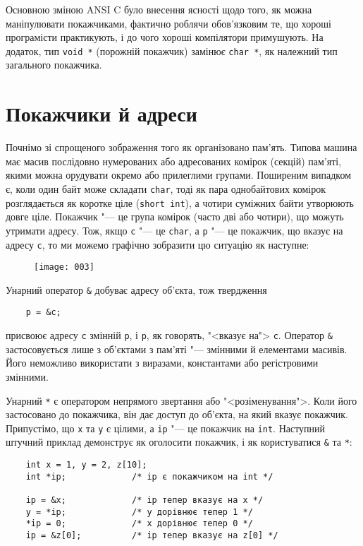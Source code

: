 \documentclass[a4paper,12pt]{book}
\begin{document}
  Основною зміною ANSI C було внесення ясності щодо того, як можна маніпулювати
  покажчиками, фактично роблячи обов'язковим те, що хороші програмісти практикують, і до
  чого хороші компілятори примушують. На додаток, тип \texttt{void *} (порожній покажчик)
  замінює \texttt{char *}, як належний тип загального покажчика.

\section{Покажчики й адреси}


  Почнімо зі спрощеного зображення того як організовано пам'ять. Типова машина має масив
  послідовно нумерованих або адресованих комірок (секцій) пам'яті, якими можна орудувати
  окремо або прилеглими групами. Поширеним випадком є, коли один байт може складати
  \texttt{char}, тоді як пара однобайтових комірок розглядається як коротке ціле
  (\texttt{short int}), а чотири суміжних байти утворюють довге ціле. Покажчик "--- це
  група комірок (часто дві або чотири), що можуть утримати адресу. Тож, якщо \texttt{c}
  "--- це \texttt{char}, а \texttt{p} "--- це покажчик, що вказує на адресу
  \texttt{c}, то ми можемо графічно зобразити цю ситуацію як наступне:
  \begin{figure}[!htb]
  \centering
  \texttt{[image: 003]}
  \end{figure}

  Унарний оператор \texttt{\&} добуває адресу об'єкта, тож твердження
  \begin{verbatim}
    p = &c;
  \end{verbatim}
  присвоює адресу \texttt{c} змінній \texttt{p}, і \texttt{p}, як говорять, "<вказує
  на"> \texttt{c}. Оператор \texttt{\&} застосовується лише з об'єктами з пам'яті
  "--- змінними й елементами масивів. Його неможливо використати з виразами,
  константами або регістровими змінними.

  Унарний \texttt{*} є оператором непрямого звертання або "<розіменування">.
  Коли його застосовано до покажчика, він дає доступ до об'єкта, на який вказує покажчик.
  Припустімо, що \texttt{x} та \texttt{y} є цілими, а \texttt{ip} "--- це покажчик на
  \texttt{int}. Наступний штучний приклад демонструє як оголосити покажчик, і як
  користуватися \texttt{\&} та \texttt{*}:
  \begin{verbatim}
    int x = 1, y = 2, z[10];
    int *ip;             /* ip є покажчиком на int */

    ip = &x;             /* ip тепер вказує на x */
    y = *ip;             /* y дорівнює тепер 1 */
    *ip = 0;             /* x дорівнює тепер 0 */
    ip = &z[0];          /* ip тепер вказує на z[0] */
  \end{verbatim}
\end{document}
